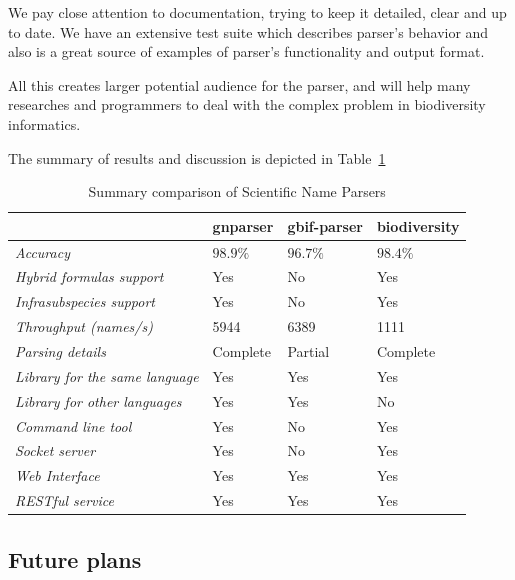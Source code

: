 \documentclass{bmcart}
\begin{document}
We pay close attention to documentation, trying to keep it detailed, clear and
up to date. We have an extensive test suite which describes parser's behavior
and also is a great source of examples of parser's functionality and output
format.

All this creates larger potential audience for the parser, and will help many
researches and programmers to deal with the complex problem in biodiversity
informatics.

The summary of results and discussion is depicted in
Table~\ref{table:summary}

\begin{table}[htb]
  \begin{center}
    \caption{Summary comparison of Scientific Name Parsers}
    \label{table:summary}
    \resizebox{12.5cm}{!} {
    \begin{tabular}{|l|*{3}{l}|}
      \hline
                             & gnparser & gbif-parser & biodiversity \\
      \hline
      \textit{Accuracy}                     & $98.9\%$ & $96.7\%$ & $98.4\%$\\
      \textit{Hybrid formulas support}      & Yes      & No       & Yes     \\
      \textit{Infrasubspecies support}      & Yes      & No       & Yes     \\
      \textit{Throughput (names/s)}         & 5944     & 6389     & 1111    \\
      \textit{Parsing details}              & Complete & Partial  & Complete\\
      \textit{Library for the same language}& Yes      & Yes      & Yes     \\
      \textit{Library for other languages}  & Yes      & Yes      & No      \\
      \textit{Command line tool}            & Yes      & No       & Yes     \\
      \textit{Socket server}                & Yes      & No       & Yes     \\
      \textit{Web Interface}                & Yes      & Yes      & Yes     \\
      \textit{RESTful service}              & Yes      & Yes      & Yes     \\
      \hline
    \end{tabular}
  }
  \end{center}
\end{table}

\subsection*{Future plans}
\end{document}
